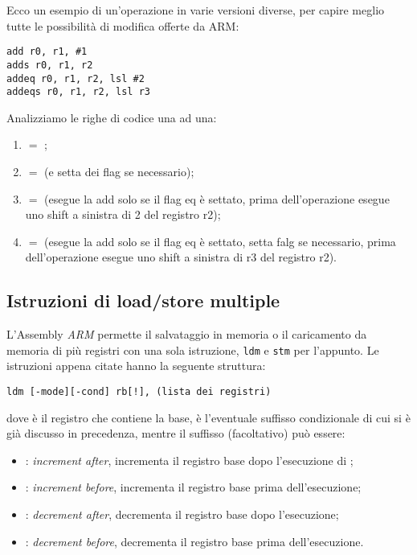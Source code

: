 \documentclass[class=book, crop=false, oneside]{standalone}
\begin{document}
Ecco un esempio di un'operazione in varie versioni diverse, per capire meglio tutte le possibilità di modifica offerte da ARM:
\begin{verbatim}
add r0, r1, #1
adds r0, r1, r2
addeq r0, r1, r2, lsl #2
addeqs r0, r1, r2, lsl r3
\end{verbatim}
Analizziamo le righe di codice una ad una:
\begin{enumerate}
	\item {} \(=\) ;
	\item {} \(=\)  (e setta dei flag se necessario);
	\item {} \(=\)  (esegue la add solo se il flag eq è settato, prima dell'operazione esegue uno shift a sinistra di 2 del registro r2);
	\item {} \(=\)  (esegue la add solo se il flag eq è settato, setta falg se necessario, prima dell'operazione esegue uno shift a sinistra di r3 del registro r2).
\end{enumerate}

\subsection*{Istruzioni di load/store multiple}
L'Assembly \emph{ARM} permette il salvataggio in memoria o il caricamento da memoria di più registri con una sola istruzione, \texttt{ldm} e \texttt{stm} per l'appunto. Le istruzioni appena citate hanno la seguente struttura:
\begin{center}
	\texttt{ldm [-mode][-cond] rb[!], (lista dei registri)}
\end{center}
dove  è il registro che contiene la base,  è l'eventuale suffisso condizionale di cui si è già discusso in precedenza, mentre il suffisso (facoltativo)  può essere:
\begin{itemize}
	\item {}: \emph{increment after}, incrementa il registro base dopo l'esecuzione di ;
	\item {}: \emph{increment before}, incrementa il registro base prima dell'esecuzione;
	\item {}: \emph{decrement after}, decrementa il registro base dopo l'esecuzione;
	\item {}: \emph{decrement before}, decrementa il registro base prima dell'esecuzione.
\end{itemize}
\end{document}
